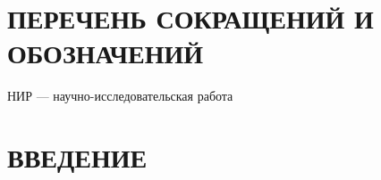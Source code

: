 \section*{ПЕРЕЧЕНЬ СОКРАЩЕНИЙ И ОБОЗНАЧЕНИЙ} %

НИР — научно-исследовательская работа

\section*{ВВЕДЕНИЕ}
